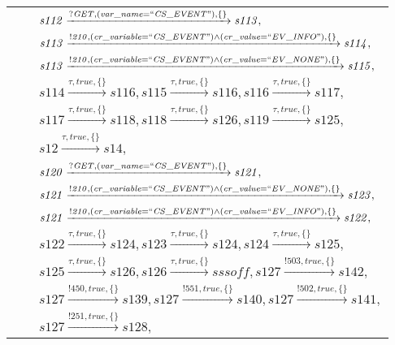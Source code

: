 \begin{tabular}{lcp{350px}}
& & $\mathit{s112}\xrightarrow{\mathit{?GET}, \mathit{(var\_name = ``CS\_EVENT")}, \{\}}\mathit{s113},$ \\
& & $\mathit{s113}\xrightarrow{\mathit{!210}, \mathit{(cr\_variable = ``CS\_EVENT") \land (cr\_value = ``EV\_INFO")}, \{\}}\mathit{s114},$ \\
& & $\mathit{s113}\xrightarrow{\mathit{!210}, \mathit{(cr\_variable = ``CS\_EVENT") \land (cr\_value = ``EV\_NONE")}, \{\}}\mathit{s115},$ \\
& & $\mathit{s114}\xrightarrow{\mathit{\tau}, \mathit{true}, \{\}}\mathit{s116},\mathit{s115}\xrightarrow{\mathit{\tau}, \mathit{true}, \{\}}\mathit{s116},\mathit{s116}\xrightarrow{\mathit{\tau}, \mathit{true}, \{\}}\mathit{s117},$ \\
& & $\mathit{s117}\xrightarrow{\mathit{\tau}, \mathit{true}, \{\}}\mathit{s118},\mathit{s118}\xrightarrow{\mathit{\tau}, \mathit{true}, \{\}}\mathit{s126},\mathit{s119}\xrightarrow{\mathit{\tau}, \mathit{true}, \{\}}\mathit{s125},$ \\
& & $\mathit{s12}\xrightarrow{\mathit{\tau}, \mathit{true}, \{\}}\mathit{s14},$ \\
& & $\mathit{s120}\xrightarrow{\mathit{?GET}, \mathit{(var\_name = ``CS\_EVENT")}, \{\}}\mathit{s121},$ \\
& & $\mathit{s121}\xrightarrow{\mathit{!210}, \mathit{(cr\_variable = ``CS\_EVENT") \land (cr\_value = ``EV\_NONE")}, \{\}}\mathit{s123},$ \\
& & $\mathit{s121}\xrightarrow{\mathit{!210}, \mathit{(cr\_variable = ``CS\_EVENT") \land (cr\_value = ``EV\_INFO")}, \{\}}\mathit{s122},$ \\
& & $\mathit{s122}\xrightarrow{\mathit{\tau}, \mathit{true}, \{\}}\mathit{s124},\mathit{s123}\xrightarrow{\mathit{\tau}, \mathit{true}, \{\}}\mathit{s124},\mathit{s124}\xrightarrow{\mathit{\tau}, \mathit{true}, \{\}}\mathit{s125},$ \\
& & $\mathit{s125}\xrightarrow{\mathit{\tau}, \mathit{true}, \{\}}\mathit{s126},\mathit{s126}\xrightarrow{\mathit{\tau}, \mathit{true}, \{\}}\mathit{sssoff},\mathit{s127}\xrightarrow{\mathit{!503}, \mathit{true}, \{\}}\mathit{s142},$ \\
& & $\mathit{s127}\xrightarrow{\mathit{!450}, \mathit{true}, \{\}}\mathit{s139},\mathit{s127}\xrightarrow{\mathit{!551}, \mathit{true}, \{\}}\mathit{s140},\mathit{s127}\xrightarrow{\mathit{!502}, \mathit{true}, \{\}}\mathit{s141},$ \\
& & $\mathit{s127}\xrightarrow{\mathit{!251}, \mathit{true}, \{\}}\mathit{s128},$ \\

\end{tabular}
